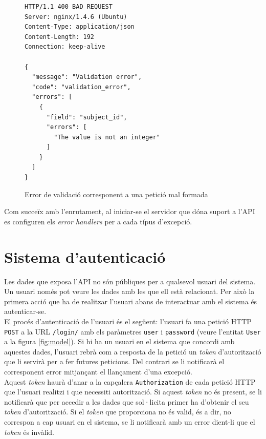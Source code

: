 \begin{figure}[h!]
	\begin{verbatim}
HTTP/1.1 400 BAD REQUEST
Server: nginx/1.4.6 (Ubuntu)
Content-Type: application/json
Content-Length: 192
Connection: keep-alive

{
  "message": "Validation error", 
  "code": "validation_error", 
  "errors": [
    {
      "field": "subject_id", 
      "errors": [
        "The value is not an integer"
      ]
    }
  ]
}
	\end{verbatim}
	\caption{Error de validació corresponent a una petició mal formada}
	\label{fig:validation_error}
\end{figure}
Com succeïx amb l'enrutament, al iniciar-se el servidor que dóna suport a l'\ac{API} es configuren els \emph{error handlers} per a cada típus d'excepció. 

\section{Sistema d'autenticació} \label{sistema_autenticacio}

Les dades que exposa l'\ac{API} no són públiques per a qualsevol usuari del sistema. Un usuari només pot veure les dades amb les que ell està relacionat. Per això la primera acció que ha de realitzar l'usuari abans de interactuar amb el sistema és autenticar-se.\\

El procés d'autenticació de l'usuari és el següent: l'usuari fa una petició \ac{HTTP} \texttt{POST} a la \ac{URL} \texttt{/login/} amb els paràmetres \texttt{user} i \texttt{password} (veure l'entitat \texttt{User} a la figura \ref{fig:model}). Si hi ha un usuari en el sistema que concordi amb aquestes dades, l'usuari rebrà com a resposta de la petició un \emph{token} d'autorització que li servirà per a fer futures peticions. Del contrari se li notificarà el corresponent error mitjançant el llançament d'una excepció.\\

Aquest \emph{token} haurà d'anar a la capçalera \texttt{Authorization} de cada petició \ac{HTTP} que l'usuari realitzi i que necessiti autorització. Si aquest \emph{token} no és present, se li notificarà que per accedir a les dades que sol·licita primer ha d'obtenir el seu \emph{token} d'autorització. Si el \emph{token} que proporciona no és valid, és a dir, no correspon a cap usuari en el sistema, se li notificarà amb un error dient-li que el \emph{token} és invàlid.\\

